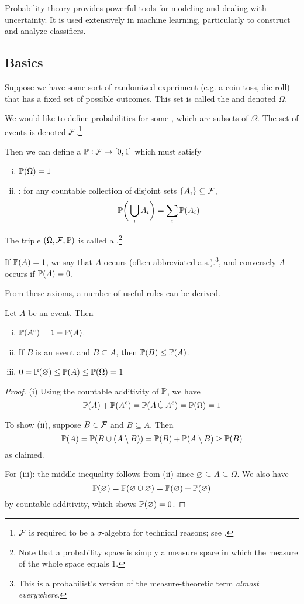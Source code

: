 Probability theory provides powerful tools for modeling and dealing with uncertainty.
It is used extensively in machine learning, particularly to construct and analyze classifiers.

\subsection{Basics}
Suppose we have some sort of randomized experiment (e.g. a coin toss, die roll) that has a fixed set of possible outcomes.
This set is called the  and denoted $\Omega$.

We would like to define probabilities for some , which are subsets of $\Omega$.
The set of events is denoted $\calF$.\footnote{
    $\calF$ is required to be a $\sigma$-algebra for technical reasons; see \cite{rigorousprob}.
}

Then we can define a  $\P : \calF \to [0,1]$ which must satisfy
\begin{enumerate}[(i)]
\item $\pr{\Omega} = 1$
\item {}: for any countable collection of disjoint sets $\{A_i\} \subseteq \calF$,
\[\prbigg{\bigcup_i A_i} = \sum_i \pr{A_i}\]
\end{enumerate}
The triple $(\Omega, \calF, \P)$ is called a .\footnote{
    Note that a probability space is simply a measure space in which the measure of the whole space equals 1.
}

If $\pr{A} = 1$, we say that $A$ occurs  (often abbreviated a.s.).\footnote{
    This is a probabilist's version of the measure-theoretic term \textit{almost everywhere}.
}, and conversely $A$ occurs  if $\pr{A} = 0$.

From these axioms, a number of useful rules can be derived.
\begin{proposition}
Let $A$ be an event. Then
\begin{enumerate}[(i)]
\item $\pr{A\comp} = 1 - \pr{A}$.
\item If $B$ is an event and $B \subseteq A$, then $\pr{B} \leq \pr{A}$.
\item $0 = \pr{\varnothing} \leq \pr{A} \leq \pr{\Omega} = 1$
\end{enumerate}
\end{proposition}
\begin{proof}
(i) Using the countable additivity of $\P$, we have
\[\pr{A} + \pr{A\comp} = \pr{A \dotcup A\comp} = \pr{\Omega} = 1\]

To show (ii), suppose $B \in \calF$ and $B \subseteq A$. Then
\[\pr{A} = \pr{B \dotcup (A \setminus B)} = \pr{B} + \pr{A \setminus B} \geq \pr{B}\]
as claimed.

For (iii): the middle inequality follows from (ii) since $\varnothing \subseteq A \subseteq \Omega$.
We also have
\[\pr{\varnothing} = \pr{\varnothing \dotcup \varnothing} = \pr{\varnothing} + \pr{\varnothing}\]
by countable additivity, which shows $\pr{\varnothing} = 0$.
\end{proof}

